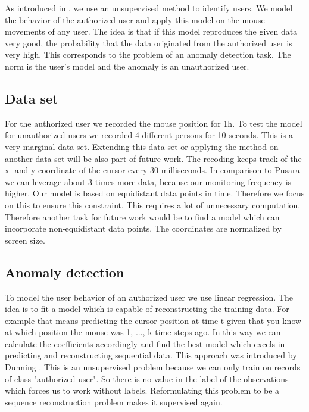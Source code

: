 \documentclass[conference]{IEEEtran}
\begin{document}
As introduced in \cite{pusara2004user}, we use an unsupervised method to identify users. We model the behavior of the authorized user and apply this model on the mouse movements of any user. The idea is that if this model reproduces the given data very good, the probability that the data originated from the authorized user is very high. This corresponds to the problem of an anomaly detection task. The norm is the user's model and the anomaly is an unauthorized user.

\subsection{Data set}

For the authorized user we recorded the mouse position for 1h. To test the model for unauthorized users we recorded 4 different persons for 10 seconds. This is a very marginal data set. Extending this data set or applying the method on another data set will be also part of future work. 
The recoding keeps track of the x- and y-coordinate of the cursor every 30 milliseconds. In comparison to Pusara \cite{pusara2004user} we can leverage about 3 times more data, because our monitoring frequency is higher. Our model is based on equidistant data points in time. Therefore we focus on this to ensure this constraint. This requires a lot of unnecessary computation. Therefore another task for future work would be to find a model which can incorporate non-equidistant data points.
The coordinates are normalized by screen size. 

\subsection{Anomaly detection}

To model the user behavior of an authorized user we use linear regression. The idea is to fit a model which is capable of reconstructing the training data. For example that means predicting the cursor position at time t given that you know at which position the mouse was 1, ..., k time steps ago. In this way we can calculate the
coefficients accordingly and find the best model which excels in predicting and reconstructing sequential data. This approach was introduced by Dunning \cite{dunning2014practical}. This is an unsupervised problem because we can only train on records of class "authorized user". So there is no value in the label of the observations which forces us to work without labels. Reformulating this problem to be a sequence reconstruction problem makes it supervised again.
\end{document}
